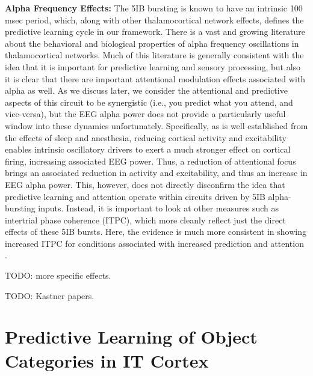 \documentclass[11pt,twoside]{article}
\newif\myifpdf
\begin{document}
{\bf Alpha Frequency Effects:} The 5IB bursting is known to have an intrinsic 100 msec period, which, along with other thalamocortical network effects, defines the predictive learning cycle in our framework.  There is a vast and growing literature about the behavioral and biological properties of alpha frequency oscillations in thalamocortical networks.  Much of this literature is generally consistent with the idea that it is important for predictive learning and sensory processing, but also it is clear that there are important attentional modulation effects associated with alpha as well.  As we discuss later, we consider the attentional and predictive aspects of this circuit to be synergistic (i.e., you predict what you attend, and vice-versa), but the EEG alpha power does not provide a particularly useful window into these dynamics unfortunately.  Specifically, as is well established from the effects of sleep and anesthesia, reducing cortical activity and excitability enables intrinsic oscillatory drivers to exert a much stronger effect on cortical firing, increasing associated EEG power.  Thus, a reduction of attentional focus brings an associated reduction in activity and excitability, and thus an increase in EEG alpha power.  This, however, does not directly disconfirm the idea that predictive learning and attention operate within circuits driven by 5IB alpha-bursting inputs.  Instead, it is important to look at other measures such as intertrial phase coherence (ITPC), which more cleanly reflect just the direct effects of these 5IB bursts.  Here, the evidence is much more consistent in showing increased ITPC for conditions associated with increased prediction and attention \cite{papers}.

TODO: more specific effects.

TODO: Kastner papers.

\section{Predictive Learning of Object Categories in IT Cortex}
\end{document}
